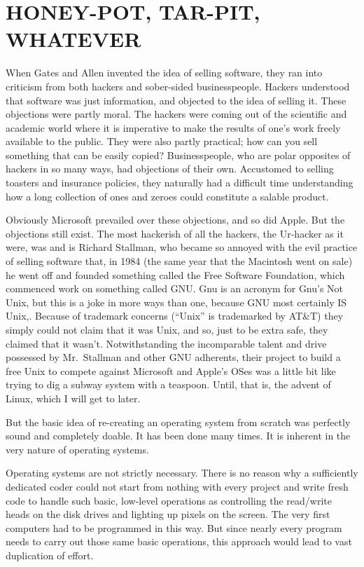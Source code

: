 \documentclass[
  fontsize=11pt,
  paper=landscape,
  twocolumn=true,
  pagesize=pdftex,
  headings=small,
  DIV=15,
  ]{scrartcl}
\begin{document}
\section{HONEY-POT, TAR-PIT, WHATEVER}

When Gates and Allen invented the idea of selling software, they ran
into criticism from both hackers and sober-sided businesspeople. Hackers
understood that software was just information, and objected to the idea
of selling it. These objections were partly moral. The hackers were
coming out of the scientific and academic world where it is imperative
to make the results of one's work freely available to the public. They
were also partly practical; how can you sell something that can be
easily copied? Businesspeople, who are polar opposites of hackers in so
many ways, had objections of their own. Accustomed to selling toasters
and insurance policies, they naturally had a difficult time
understanding how a long collection of ones and zeroes could constitute
a salable product.

Obviously Microsoft prevailed over these objections, and so did Apple.
But the objections still exist. The most hackerish of all the hackers,
the Ur-hacker as it were, was and is Richard Stallman, who became so
annoyed with the evil practice of selling software that, in 1984 (the
same year that the Macintosh went on sale) he went off and founded
something called the Free Software Foundation, which commenced work on
something called GNU. Gnu is an acronym for Gnu's Not Unix, but this is
a joke in more ways than one, because GNU most certainly IS Unix,.
Because of trademark concerns (``Unix'' is trademarked by AT\&T) they
simply could not claim that it was Unix, and so, just to be extra safe,
they claimed that it wasn't. Notwithstanding the incomparable talent and
drive possessed by Mr.~Stallman and other GNU adherents, their project
to build a free Unix to compete against Microsoft and Apple's OSes was a
little bit like trying to dig a subway system with a teaspoon. Until,
that is, the advent of Linux, which I will get to later.

But the basic idea of re-creating an operating system from scratch was
perfectly sound and completely doable. It has been done many times. It
is inherent in the very nature of operating systems.

Operating systems are not strictly necessary. There is no reason why a
sufficiently dedicated coder could not start from nothing with every
project and write fresh code to handle such basic, low-level operations
as controlling the read/write heads on the disk drives and lighting up
pixels on the screen. The very first computers had to be programmed in
this way. But since nearly every program needs to carry out those same
basic operations, this approach would lead to vast duplication of
effort.
\end{document}
